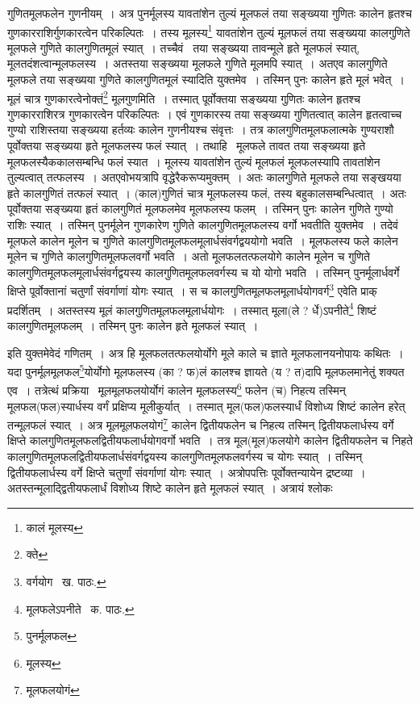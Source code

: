 \documentclass[11pt, openany]{book}
\begin{document}
\noindent गुणितमूलफलेन गुणनीयम्~। अत्र पुनर्मूलस्य यावतांशेन तुल्यं मूलफलं तया सङ्ख्यया गुणितः कालेन हृतश्च गुणकारराशिर्गुणकारत्वेन परिकल्पितः~। तस्य मूलस्य\renewcommand{\thefootnote}{१}\footnote{कालं मूलस्य} यावतांशेन तुल्यं मूलफलं तया सङ्ख्यया कालगुणिते मूलफले गुणिते कालगुणितमूलं स्यात्~।  तच्चैवं \textendash\ तया सङ्ख्यया तावन्मूले हृते मूलफलं स्यात्, मूलतदंशत्वान्मूलफलस्य~। अतस्तया सङ्ख्यया मूलफले गुणिते मूलमपि स्यात्~। अतएव कालगुणिते मूलफले तया सङ्ख्यया गुणिते कालगुणितमूलं स्यादिति युक्तमेव~। तस्मिन् पुनः कालेन हृते मूलं भवेत्~। मूलं चात्र गुणकारत्वेनोक्तं\renewcommand{\thefootnote}{२}\footnote{क्ते} मूलगुणमिति~। तस्मात् पूर्वोक्तया सङ्ख्यया गुणितः कालेन हृतश्च गुणकारराशिरत्र गुणकारत्वेन परिकल्पितः~। एवं गुणकारस्य तया सङ्ख्यया गुणितत्वात् कालेन हृतत्वाच्च गुण्यो राशिस्तया सङ्ख्यया हर्तव्यः कालेन गुणनीयश्च संवृत्तः~। तत्र कालगुणितमूलफलात्मके गुण्यराशौ पूर्वोक्तया सङ्ख्यया हृते मूलफलस्य फलं स्यात्~। तथाहि \textendash\ मूलफले तावत तया सङ्ख्यया हृते मूलफलस्यैककालसम्बन्धि फलं स्यात~। मूलस्य यावतांशेन तुल्यं मूलफलं मूलफलस्यापि तावतांशेन तुल्यत्वात् तत्फलस्य~। अतएवोभयत्रापि वृद्धेरैकरूप्यमुक्तम्~। अतः कालगुणिते मूलफले तया सङ्खयया हृते कालगुणितं तत्फलं स्यात्~। (काल)गुणितं चात्र मूलफलस्य फलं, तस्य बहुकालसम्बन्धित्वात्~। अतः पूर्वोक्तया सङ्ख्यया हृतं कालगुणितं मूलफलमेव मूलफलस्य फलम्~। तस्मिन् पुनः कालेन गुणिते गुण्यो राशिः स्यात्~। तस्मिन् पुनर्मूलेन गुणकारेण गुणिते कालगुणितमूलफलस्य वर्गो भवतीति युक्तमेव~। तदेवं मूलफले कालेन मूलेन च गुणिते कालगुणितमूलफलमूलार्धसंवर्गद्वययोगो भवति~। मूलफलस्य फले कालेन मूलेन च गुणिते कालगुणितमूलफलवर्गो भवति~। अतो मूलफलतत्फलयोगे कालेन मूलेन च गुणिते कालगुणितमूलफलमूलार्धसंवर्गद्वयस्य कालगुणितमूलफलवर्गस्य च यो योगो भवति~। तस्मिन् पुनर्मूलार्धवर्गे क्षिप्ते पूर्वोक्तानां चतुर्णां संवर्गाणां योगः स्यात्~। स च कालगुणितमूलफलमूलार्धयोगवर्ग\renewcommand{\thefootnote}{३}\footnote{वर्गयोग \textendash\ ख. पाठः.} एवेति प्राक् प्रदर्शितम्~। अतस्तस्य मूलं कालगुणितमूलफलमूलार्धयोगः~। तस्मात् मूला(ले ? र्धे)ऽपनीते\renewcommand{\thefootnote}{४}\footnote{मूलफलेऽपनीते \textendash\ क. पाठः.} शिष्टं कालगुणितमूलफलम्~। तस्मिन् पुनः कालेन हृते मूलफलं स्यात्~।

\newpage

\noindent इति युक्तमेवेदं गणितम्~। अत्र हि मूलफलतत्फलयोर्योगे मूले काले च ज्ञाते मूलफलानयनोपायः कथितः~। यदा पुनर्मूलमूलफल\renewcommand{\thefootnote}{१}\footnote{पुनर्मूलफल}योर्योगो मूलफलस्य (का ? फ)लं कालश्च ज्ञायते (य ? त)दापि मूलफलमानेतुं शक्यत एव~। तत्रेत्थं प्रक्रिया \textendash\ मूलमूलफलयोर्योगं कालेन मूलफलस्य\renewcommand{\thefootnote}{२}\footnote{मूलस्य} फलेन (च) निहत्य तस्मिन् मूलफल(फल)स्यार्धस्य वर्गं प्रक्षिप्य मूलीकुर्यात्~। तस्मात् मूल(फल)फलस्यार्धं विशोध्य शिष्टं कालेन हरेत् तन्मूलफलं स्यात्~। अत्र मूलमूलफलयोगं\renewcommand{\thefootnote}{३}\footnote{मूलफलयोगं} कालेन द्वितीयफलेन च निहत्य तस्मिन् द्वितीयफलार्धस्य वर्गे क्षिप्ते कालगुणितमूलफलद्वितीयफलार्धयोगवर्गो भवति~। तत्र मूल(मूल)फलयोगे कालेन द्वितीयफलेन च निहते कालगुणितमूलफलद्वितीयफलार्धसंवर्गद्वयस्य कालगुणितमूलफलवर्गस्य च योगः स्यात्~। तस्मिन् द्वितीयफलार्धस्य वर्गे क्षिप्ते चतुर्णां संवर्गाणां योगः स्यात्~। अत्रोपपत्तिः पूर्वोक्तन्यायेन द्रष्टव्या~। अतस्तन्मूलाद्द्वितीयफलार्धं विशोध्य शिष्टे कालेन हृते मूलफलं स्यात्~। अत्रायं श्लोकः\textendash
\end{document}
